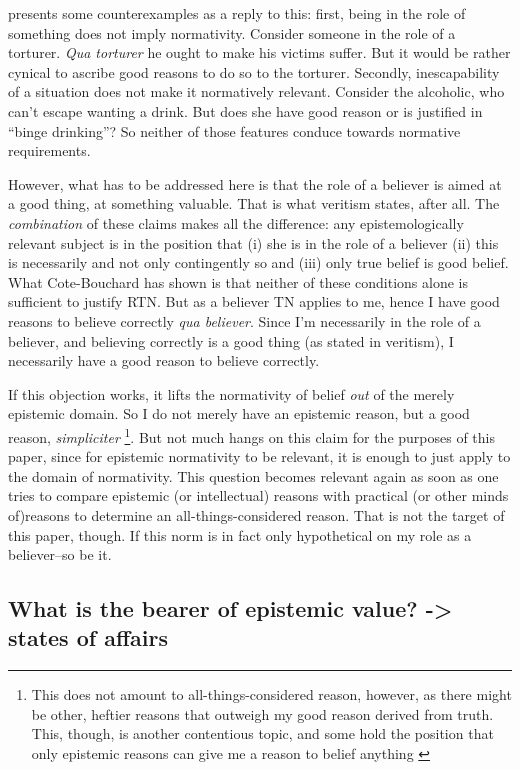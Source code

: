 \documentclass[12pt,numbers=noenddot]{scrartcl}
\begin{document}
\textcite[9]{Cote-BouchardForthcoming-CTBCTA} presents some counterexamples as a reply to this: first, being in the role of something does not imply normativity. Consider someone in the role of a torturer. \emph{Qua torturer} he ought to make his victims suffer. But it would be rather cynical to ascribe good reasons to do so to the torturer. Secondly, inescapability of a situation does not make it normatively relevant. Consider the alcoholic, who can't escape wanting a drink. But does she have good reason or is justified in “binge drinking”? So neither of those features conduce towards normative requirements.

However, what has to be addressed here is that the role of a believer is aimed at a good thing, at something valuable. That is what veritism states, after all. The \emph{combination} of these claims makes all the difference: any epistemologically relevant subject is in the position that (i) she is in the role of a believer (ii) this is necessarily and not only contingently so and (iii) only true belief is good belief. What Cote-Bouchard has shown is that neither of these conditions alone is sufficient to justify RTN. But as a believer TN applies to me, hence I have good reasons to believe correctly \emph{qua believer}. Since I'm necessarily in the role of a believer, and believing correctly is a good thing (as stated in veritism), I necessarily have a good reason to believe correctly.

If this objection works, it lifts the normativity of belief \emph{out} of the merely epistemic domain. So I do not merely have an epistemic reason, but a good reason, \emph{simpliciter}
\footnote{This does not amount to all-things-considered reason, however, as there might be other, heftier reasons that outweigh my good reason derived from truth. This, though, is another contentious topic, and some hold the position that only epistemic reasons can give me a reason to belief anything \autocite{Kelly2003-KELERA}}.
But not much hangs on this claim for the purposes of this paper, since for epistemic normativity to be relevant, it is enough to just apply to the domain of normativity. This question becomes relevant again as soon as one tries to compare epistemic (or intellectual) reasons with practical (or other minds of)reasons to determine an all-things-considered reason. That is not the target of this paper, though. If this norm is in fact  only hypothetical on my role as a believer–so be it.

\subsection{ What is the bearer of epistemic value? -> states of affairs}
\end{document}
